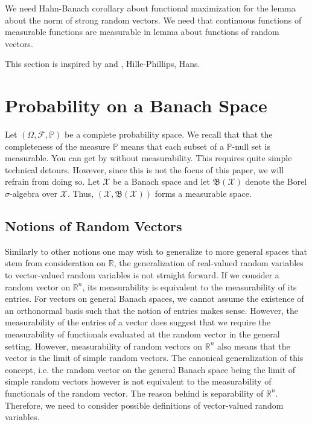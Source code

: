 \newpage

\begin{remark}[]
    We need Hahn-Banach corollary about functional maximization for the lemma about the norm of strong random vectors. We need that continuous functions of measurable functions are measurable in lemma about functions of random vectors.
\end{remark}


This section is inspired by \cite{bharucha1972random} and \cite{ledoux1991probability}, Hille-Phillips, Hans.


\section{Probability on a Banach Space}
Let \( (\Omega, \mathcal{F}, \mathbb{P}) \) be a complete probability space. We recall that that the completeness of the measure \( \mathbb{P} \) means that each subset of a \( \mathbb{P} \)-null set is measurable. You can get by without measurability. This requires quite simple technical detours. However, since this is not the focus of this paper, we will refrain from doing so. Let \( \mathcal{X} \) be a Banach space and let \( \mathfrak{B}(\mathcal{X}) \) denote the Borel \( \sigma \)-algebra over \( \mathcal{X} \). Thus, \( (\mathcal{X}, \mathfrak{B}(\mathcal{X})) \) forms a measurable space.


\subsection{Notions of Random Vectors}
Similarly to other notions one may wish to generalize to more general spaces that stem from consideration on \( \mathbb{R} \), the generalization of real-valued random variables to vector-valued random variables is not straight forward. If we consider a random vector on \( \mathbb{R}^{n} \), its measurability is equivalent to the measurability of its entries. For vectors on general Banach spaces, we cannot assume the existence of an orthonormal basis such that the notion of entries makes sense. However, the measurability of the entries of a vector does suggest that we require the measurability of functionals evaluated at the random vector in the general setting. However, measurability of random vectors on \( \mathbb{R}^{n} \) also means that the vector is the limit of simple random vectors. The canonical generalization of this concept, i.e. the random vector on the general Banach space being the limit of simple random vectors however is not equivalent to the measurability of functionals of the random vector. The reason behind is separability of \( \mathbb{R}^{n} \). Therefore, we need to consider possible definitions of vector-valued random variables.


